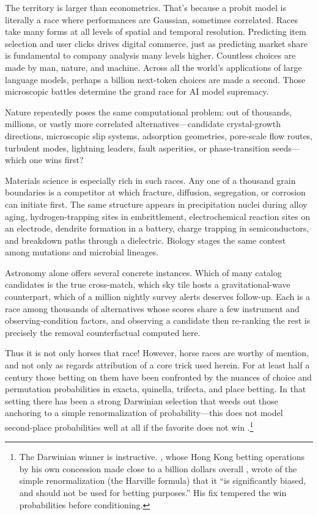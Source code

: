 \documentclass[12pt]{article}
\theoremstyle{remark}
\begin{document}
The territory is larger than econometrics. That's because a probit model is literally a race where performances
are Gaussian, sometimes correlated. Races take many forms at all levels of spatial and temporal resolution. Predicting item selection and user clicks drives digital commerce, just as 
predicting market share is fundamental to company analysis many levels
higher. Countless choices are made by man, nature, and machine. Across all the world's applications
of large language models, perhaps a billion next-token choices are made a second. Those microscopic battles
determine the grand race for AI model supremacy.

Nature repeatedly poses the same computational problem: out of thousands, millions, or vastly more correlated alternatives---candidate crystal-growth directions, microscopic slip systems, adsorption geometries, pore-scale flow routes, turbulent modes, lightning leaders, fault asperities, or phase-transition seeds---which one wins first?

Materials science is especially rich in such races. Any one of a
thousand grain boundaries is a competitor at which fracture, diffusion,
segregation, or corrosion can initiate first. The same structure
appears in precipitation nuclei during alloy aging, hydrogen-trapping
sites in embrittlement, electrochemical reaction sites on an electrode,
dendrite formation in a battery, charge trapping in semiconductors, and
breakdown paths through a dielectric. Biology stages the same contest
among mutations and microbial lineages.

Astronomy alone offers several concrete instances. Which of many
catalog candidates is the true cross-match, which sky tile hosts a
gravitational-wave counterpart, which of a million nightly survey
alerts deserves follow-up. Each is a race among thousands of
alternatives whose scores share a few instrument and observing-condition
factors, and observing a candidate then re-ranking the rest is
precisely the removal counterfactual computed here.

Thus it is not only horses that race! However, horse races are worthy of mention, and not only as regards attribution of a core trick used herein. For at least half a century those betting on them have been confronted by the nuances of choice and permutation probabilities in exacta, quinella, trifecta, and place betting. In that setting there has been a strong Darwinian selection that weeds out those anchoring to a simple renormalization of probability---this does not model second-place probabilities well at all if the favorite does not win \citep{henery1981,lo1994}.\footnote{The
Darwinian winner is instructive. \citet{benter1994}, whose Hong Kong
betting operations by his own concession made close to a billion
dollars overall \citep{chellel2018}, wrote of the simple
renormalization (the Harville formula) that it ``is significantly
biased, and should not be used for betting purposes.'' His fix
tempered the win probabilities before conditioning.}
\end{document}
